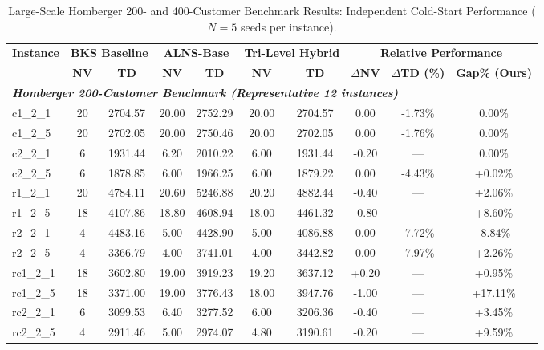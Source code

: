 \documentclass{article}
\begin{document}
\begin{table}[!htbp]
\caption{Large-Scale Homberger 200- and 400-Customer Benchmark Results: Independent Cold-Start Performance ($N=5$ seeds per instance).}
\label{tab:full_homberger_results}
\centering
\scriptsize
\setlength{\tabcolsep}{3.0pt}
\begin{tabular*}{\textwidth}{@{\extracolsep{\fill}} l cc cc cc ccc @{}}
\toprule
\multirow{2}{*}{\textbf{Instance}} & \multicolumn{2}{c}{\textbf{BKS Baseline}} & \multicolumn{2}{c}{\textbf{ALNS-Base}} & \multicolumn{2}{c}{\textbf{Tri-Level Hybrid}} & \multicolumn{3}{c}{\textbf{Relative Performance}} \\
\cmidrule(lr){2-3} \cmidrule(lr){4-5} \cmidrule(lr){6-7} \cmidrule(lr){8-10}
 & \textbf{NV} & \textbf{TD} & \textbf{NV} & \textbf{TD} & \textbf{NV} & \textbf{TD} & \textbf{$\Delta$NV} & \textbf{$\Delta$TD (\%)} & \textbf{Gap\% (Ours)} \\
\midrule
\multicolumn{10}{l}{\textit{\textbf{Homberger 200-Customer Benchmark (Representative 12 instances)}}} \\
c1\_2\_1 & 20 & 2704.57 & 20.00 & 2752.29 & 20.00 & 2704.57 & 0.00 & -1.73\% & 0.00\% \\
c1\_2\_5 & 20 & 2702.05 & 20.00 & 2750.46 & 20.00 & 2702.05 & 0.00 & -1.76\% & 0.00\% \\
c2\_2\_1 & 6 & 1931.44 & 6.20 & 2010.22 & 6.00 & 1931.44 & -0.20 & --- & 0.00\% \\
c2\_2\_5 & 6 & 1878.85 & 6.00 & 1966.25 & 6.00 & 1879.22 & 0.00 & -4.43\% & +0.02\% \\
r1\_2\_1 & 20 & 4784.11 & 20.60 & 5246.88 & 20.20 & 4882.44 & -0.40 & --- & +2.06\% \\
r1\_2\_5 & 18 & 4107.86 & 18.80 & 4608.94 & 18.00 & 4461.32 & -0.80 & --- & +8.60\% \\
r2\_2\_1 & 4 & 4483.16 & 5.00 & 4428.90 & 5.00 & 4086.88 & 0.00 & -7.72\% & -8.84\% \\
r2\_2\_5 & 4 & 3366.79 & 4.00 & 3741.01 & 4.00 & 3442.82 & 0.00 & -7.97\% & +2.26\% \\
rc1\_2\_1 & 18 & 3602.80 & 19.00 & 3919.23 & 19.20 & 3637.12 & +0.20 & --- & +0.95\% \\
rc1\_2\_5 & 18 & 3371.00 & 19.00 & 3776.43 & 18.00 & 3947.76 & -1.00 & --- & +17.11\% \\
rc2\_2\_1 & 6 & 3099.53 & 6.40 & 3277.52 & 6.00 & 3206.36 & -0.40 & --- & +3.45\% \\
rc2\_2\_5 & 4 & 2911.46 & 5.00 & 2974.07 & 4.80 & 3190.61 & -0.20 & --- & +9.59\% \\

\end{tabular*}
\end{table}
\end{document}
